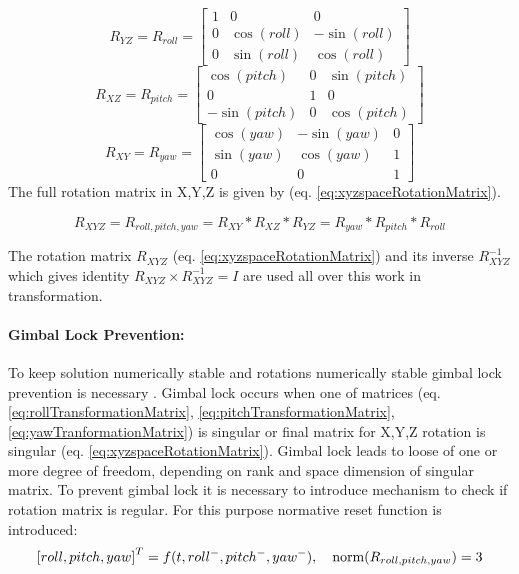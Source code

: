 \begin{equation}\label{eq:rollTransformationMatrix}
    R_{YZ} = R_{roll} =
    \begin{bmatrix}
        1 & 0 & 0\\
        0 & \cos(roll) & -\sin(roll)\\
        0 & \sin(roll) & \cos(roll)
    \end{bmatrix}
\end{equation}
\begin{equation}\label{eq:pitchTransformationMatrix}
    R_{XZ} = R_{pitch} =
    \begin{bmatrix}
        \cos(pitch) & 0 & \sin(pitch)\\
        0 & 1 & 0\\
        -\sin(pitch) & 0 & \cos(pitch)
    \end{bmatrix}
\end{equation}
\begin{equation}\label{eq:yawTranformationMatrix}
    R_{XY} = R_{yaw} = 
    \begin{bmatrix}
        \cos(yaw) & -\sin(yaw) & 0 \\
        \sin(yaw) & \cos(yaw) & 1 \\
        0 & 0 & 1
    \end{bmatrix}
\end{equation}
The full rotation matrix in X,Y,Z  is given by (eq. \ref{eq:xyzspaceRotationMatrix}).

\begin{equation}\label{eq:xyzspaceRotationMatrix}  
        R_{XYZ}  = R_{roll,pitch,yaw} =  R_{XY} * R_{XZ} * R_{YZ} = R_{yaw} * R_{pitch} *R_{roll}
\end{equation}

\begin{note}
    The rotation matrix $R_{XYZ}$ (eq. \ref{eq:xyzspaceRotationMatrix}) and its inverse $R_{XYZ}^{-1}$ which gives identity $R_{XYZ} \times R_{XYZ}^{-1} = I$ are used all over this work in transformation.
\end{note}

\paragraph{Gimbal Lock Prevention:} To keep solution numerically stable and rotations numerically stable gimbal lock prevention is necessary \cite{kramer1977gyro}. Gimbal lock occurs when one of matrices (eq. \ref{eq:rollTransformationMatrix}, \ref{eq:pitchTransformationMatrix}, \ref{eq:yawTranformationMatrix}) is singular or final matrix for X,Y,Z rotation is singular (eq. \ref{eq:xyzspaceRotationMatrix}). Gimbal lock leads to loose of one or more degree of freedom, depending on rank and space dimension of singular matrix. To prevent gimbal lock it is necessary to introduce mechanism to check if rotation matrix is regular. For this purpose normative reset function is introduced:
\begin{equation}
    \left [ roll, pitch , yaw \right ]^T = f(t,roll^-,pitch^-,yaw^-), \quad \textnormal{norm}(R_{roll,pitch, yaw})=3
\end{equation}


